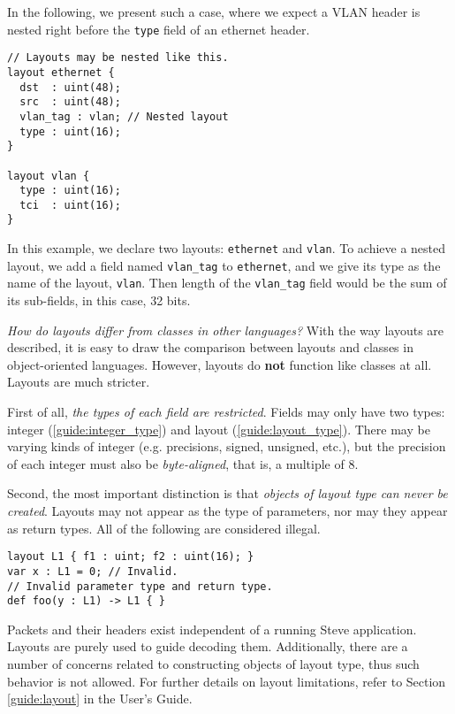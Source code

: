 In the following, we present such a case, where we expect a VLAN header \cite{vlan_std} is nested right before the \texttt{type} field of an ethernet header.

\begin{codepage}
\begin{lstlisting}
// Layouts may be nested like this.
layout ethernet {
  dst  : uint(48);
  src  : uint(48);
  vlan_tag : vlan; // Nested layout
  type : uint(16);
}

layout vlan {
  type : uint(16);
  tci  : uint(16);
}
\end{lstlisting}
\end{codepage}

In this example, we declare two layouts: \texttt{ethernet} and \texttt{vlan}. To achieve a nested layout, we add a field named \texttt{vlan\_tag} to \texttt{ethernet}, and we give its type as the name of the layout, \texttt{vlan}. Then length of the \texttt{vlan\_tag} field would be the sum of its sub-fields, in this case, 32 bits.

\textit{How do layouts differ from classes in other languages?} With the way layouts are described, it is easy to draw the comparison between layouts and classes in object-oriented languages. However, layouts do \textbf{not} function like classes at all. Layouts are much stricter.

First of all, \textit{the types of each field are restricted}. Fields may only have two types: integer (\ref{guide:integer_type}) and layout (\ref{guide:layout_type}). There may be varying kinds of integer (e.g. precisions, signed, unsigned, etc.), but the precision of each integer must also be \textit{byte-aligned}, that is, a multiple of 8.

Second, the most important distinction is that \textit{objects of layout type can never be created}. Layouts may not appear as the type of parameters, nor may they appear as return types. All of the following are considered illegal.

\begin{codepage}
\begin{lstlisting}
layout L1 { f1 : uint; f2 : uint(16); }
var x : L1 = 0; // Invalid.
// Invalid parameter type and return type.
def foo(y : L1) -> L1 { }
\end{lstlisting}
\end{codepage}

Packets and their headers exist independent of a running Steve application. Layouts are purely used to guide decoding them. Additionally, there are a number of concerns related to constructing objects of layout type, thus such behavior is not allowed. For further details on layout limitations, refer to Section \ref{guide:layout} in the User's Guide.

